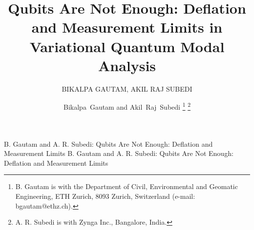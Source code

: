 \documentclass{ieeeaccess}
\begin{document}
\ifdefined\ACCESS
\history{}
\doi{}
\fi

\title{Qubits Are Not Enough: Deflation and Measurement Limits in Variational Quantum Modal Analysis}

\ifdefined\ACCESS
\author{\uppercase{Bikalpa Gautam}, \uppercase{Akil Raj Subedi}}
\address[1]{Department of Civil, Environmental and Geomatic Engineering, ETH Zurich, 8093 Zurich, Switzerland}
\address[2]{Zynga Inc., Bangalore, India}

\markboth
{B. Gautam and A. R. Subedi: Qubits Are Not Enough: Deflation and Measurement Limits}
{B. Gautam and A. R. Subedi: Qubits Are Not Enough: Deflation and Measurement Limits}

\else
\author{Bikalpa~Gautam and Akil~Raj~Subedi%
\thanks{B. Gautam is with the Department of Civil, Environmental and Geomatic
Engineering, ETH Zurich, 8093 Zurich, Switzerland (e-mail: bgautam@ethz.ch).}%
\thanks{A. R. Subedi is with Zynga Inc., Bangalore, India.}}
\fi

\ifdefined\ACCESS\else\maketitle\fi
\end{document}
